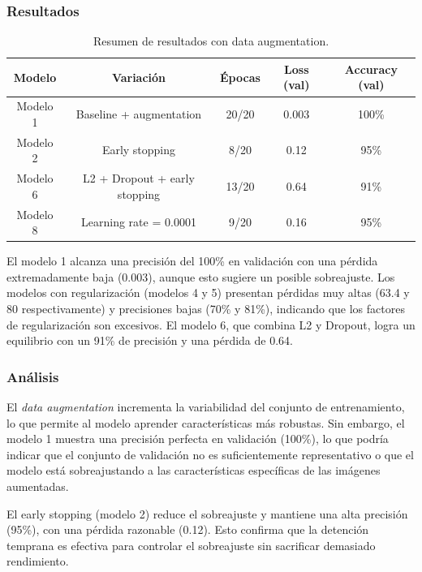 \documentclass[12pt]{article}
\begin{document}
\subsubsection*{Resultados}

\begin{table}[htbp]
\centering
\caption{Resumen de resultados con data augmentation.}
\label{tab:resumen_augment}
\begin{tabular}{c c c c c}
\toprule
\textbf{Modelo} & \textbf{Variación} & \textbf{Épocas} & \textbf{Loss (val)} & \textbf{Accuracy (val)} \\
\midrule
Modelo 1 & Baseline + augmentation & 20/20 & 0.003 & 100\% \\
Modelo 2 & Early stopping & 8/20 & 0.12 & 95\% \\
Modelo 6 & L2 + Dropout + early stopping & 13/20 & 0.64 & 91\% \\
Modelo 8 & Learning rate = 0.0001 & 9/20 & 0.16 & 95\% \\
\bottomrule
\end{tabular}
\end{table}

El modelo 1 alcanza una precisión del 100\% en validación con una pérdida extremadamente baja (0.003), aunque esto sugiere un posible sobreajuste. Los modelos con regularización (modelos 4 y 5) presentan pérdidas muy altas (63.4 y 80 respectivamente) y precisiones bajas (70\% y 81\%), indicando que los factores de regularización son excesivos. El modelo 6, que combina L2 y Dropout, logra un equilibrio con un 91\% de precisión y una pérdida de 0.64.

\subsubsection*{Análisis}

El \textit{data augmentation} incrementa la variabilidad del conjunto de entrenamiento, lo que permite al modelo aprender características más robustas. Sin embargo, el modelo 1 muestra una precisión perfecta en validación (100\%), lo que podría indicar que el conjunto de validación no es suficientemente representativo o que el modelo está sobreajustando a las características específicas de las imágenes aumentadas.

El early stopping (modelo 2) reduce el sobreajuste y mantiene una alta precisión (95\%), con una pérdida razonable (0.12). Esto confirma que la detención temprana es efectiva para controlar el sobreajuste sin sacrificar demasiado rendimiento.
\end{document}

